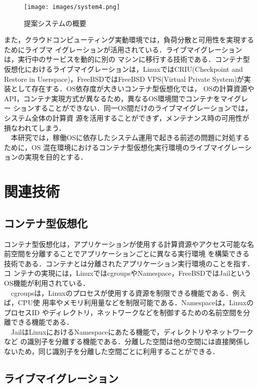 \documentclass[10pt]{jarticle}
\begin{document}
\begin{figure*}[t]
  \centering
  \texttt{[image: images/system4.png]} \\
  \caption{提案システムの概要}
  \label{fig:system}
\end{figure*}

また，クラウドコンピューティング実動環境では，負荷分散と可用性を実現するためにライブマ
イグレーションが活用されている．ライブマイグレーションは，実行中のサービスを動的に別の
マシンに移行する技術である．コンテナ型仮想化におけるライブマイグレーションは，LinuxではCRIU(Checkpoint and Restore in Userspace)\cite{container_live,criu}，FreeBSDではFreeBSD VPS(Virtual Private
 System)\cite{freebsd-vps}が実装として存在する．OS依存度が大きいコンテナ型仮想化では，
 OSの計算資源やAPI，コンテナ実現方式が異なるため，異なるOS環境間でコンテナをマイグレー
 ションすることができない．同一OS間だけのライブマイグレーションでは，システム全体の計算資
 源を活用することができず，メンテナンス時の可用性が損なわれてしまう．\\
　本研究では，稼働OSに依存したシステム運用で起きる前述の問題に対処するために，OS
混在環境におけるコンテナ型仮想化実行環境のライブマイグレーションの実現を目的とする．

\section{関連技術}
\subsection{コンテナ型仮想化}
\label{sec:container}

コンテナ型仮想化は，アプリケーションが使用する計算資源やアクセス可能な名前空間を分離することでアプリケーションごとに異なる実行環境
を構築できる技術である．コンテナとは分離されたアプリケーション実行環境のことを指す．コ
ンテナの実現には，LinuxではcgroupsやNamespace，FreeBSDではJailというOS機能が利用されている\cite{docker}．\\
　cgroupsは，Linuxのプロセスが使用する資源を制限できる機能である．例えば，CPU使
用率やメモリ利用量などを制限可能である．Namespaceは，LinuxのプロセスID
やディレクトリ，ネットワークなどを制御するための名前空間を分離できる機能である．\\
　JailはLinuxにおけるNamespaceにあたる機能で，ディレクトリやネットワークなど
の識別子を分離する機能である．分離した空間は他の空間には直接関係しないため，同じ識別子を分離した空間ごとに利用することができる．

\subsection{ライブマイグレーション}
\end{document}
